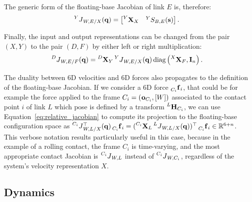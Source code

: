 \begin{definition*}
\label{definition:link_jacobian}
%
The generic form of the floating-base Jacobian of link $E$ is, therefore:
\begin{equation}
    \label{eq:relative_jacobian}
    \jac[Y]_{W,E/X}(\Qu) =
    \begin{bmatrix}
        \transvel[Y]_X & {}^Y S_{B,E}(\Shape)
    \end{bmatrix}
.
\end{equation}
%
\end{definition*}

Finally, the input and output representations can be changed from the pair $(X, Y)$ to the pair $(D, F)$ by either left or right multiplication:
%
\begin{equation}
    \label{eq:jacobian_change_of_representation}
    \jac[D]_{W,E/F}(\Qu) = \transvel[D]_Y \jac[Y]_{W,E/X}(\Qu) \operatorname{diag}\left(\transvel[X]_F, \eye_n \right)
    .
\end{equation}

\begin{remark}
\label{remark:jacobian_and_6d_forces}
%
The duality between 6D velocities and 6D forces also propagates to the definition of the floating-base Jacobian.
If we consider a 6D force $\forcesix[C_i]_i$, that could be for example the force applied to the frame $C_i = (\ori_{C_i}, [W])$ associated to the contact point $i$ of link $L$ which pose is defined by a transform $\homo[L]_{C_i}$, we can use Equation~\eqref{eq:relative_jacobian} to compute its projection to the floating-base configuration space as $\jac[C_i]_{W,L/X}^\top(\Qu) \forcesix[C_i]_i = (\transvel[C_i]_L \jac[L]_{W,L/X}(\Qu))^\top \forcesix[C_i]_i \in \realn^{6+n}$.
This verbose notation results particularly useful in this case, because in the example of a rolling contact, the frame $C_i$ is time-varying, and the most appropriate contact Jacobian is $\jac[C_i]_{W,L}$ instead of $\jac[C_i]_{W, C_i}$, regardless of the system's velocity representation $X$.
%
\end{remark}

\subsection{Dynamics}
\label{sec:multibody_dynamics}

